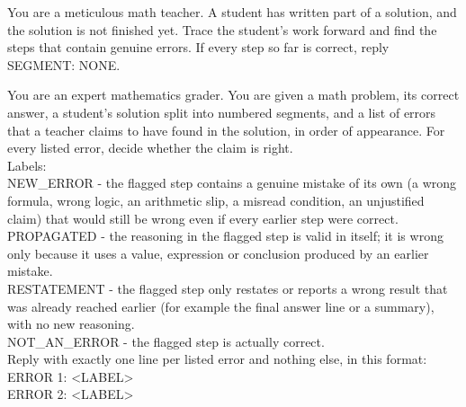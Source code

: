 \begin{prompt}[title={$\mathcal{P}_{\text{critic}}^{\text{part}}$ --- first paragraph of $\mathcal{P}_{\text{critic}}$ in Section~\ref{sec:critique-ability}, truncated solution}]
You are a meticulous math teacher. A student has written part of a solution, and the solution is not finished yet. Trace the student's work forward and find the steps that contain genuine errors. If every step so far is correct, reply SEGMENT: NONE.
\end{prompt}

\begin{prompt}[title={$\mathcal{P}_{\text{judge}}$ --- system prompt of the judge (Qwen3-8B)}]
You are an expert mathematics grader. You are given a math problem, its correct answer, a student's solution split into numbered segments, and a list of errors that a teacher claims to have found in the solution, in order of appearance. For every listed error, decide whether the claim is right.\\[4pt]
Labels:\\
NEW\_ERROR - the flagged step contains a genuine mistake of its own (a wrong formula, wrong logic, an arithmetic slip, a misread condition, an unjustified claim) that would still be wrong even if every earlier step were correct.\\
PROPAGATED - the reasoning in the flagged step is valid in itself; it is wrong only because it uses a value, expression or conclusion produced by an earlier mistake.\\
RESTATEMENT - the flagged step only restates or reports a wrong result that was already reached earlier (for example the final answer line or a summary), with no new reasoning.\\
NOT\_AN\_ERROR - the flagged step is actually correct.\\[4pt]
Reply with exactly one line per listed error and nothing else, in this format:\\
ERROR 1: \textless{}LABEL\textgreater{}\\
ERROR 2: \textless{}LABEL\textgreater{}
\end{prompt}

